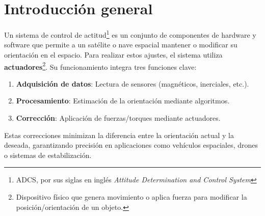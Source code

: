 
\chapter{Introducción general} %

\label{Chapter1} %
\label{IntroGeneral}
Un sistema de control de actitud\footnote{ADCS, por sus siglas en inglés \textit{Attitude Determination and Control System}} es un conjunto de componentes de hardware y software que permite a un satélite o nave espacial mantener o modificar su orientación en el espacio. Para realizar estos ajustes, el sistema utiliza \textbf{actuadores}\footnote{Dispositivo físico que genera movimiento o aplica fuerza para modificar la posición/orientación de un objeto.}. Su funcionamiento integra tres funciones clave:

\begin{enumerate}
	\item \textbf{Adquisición de datos}: Lectura de sensores (magnéticos, inerciales, etc.).
	\item \textbf{Procesamiento}: Estimación de la orientación mediante algoritmos.
	\item \textbf{Corrección}: Aplicación de fuerzas/torques mediante actuadores.
\end{enumerate}

Estas correcciones minimizan la diferencia entre la orientación actual y la deseada, garantizando precisión en aplicaciones como vehículos espaciales, drones o sistemas de estabilización.

\newcommand{\keyword}[1]{\textbf{#1}}
\newcommand{\tabhead}[1]{\textbf{#1}}
\newcommand{\code}[1]{\texttt{#1}}
\newcommand{\file}[1]{\texttt{\bfseries#1}}
\newcommand{\option}[1]{\texttt{\itshape#1}}
\newcommand{\grados}{$^{\circ}$}



